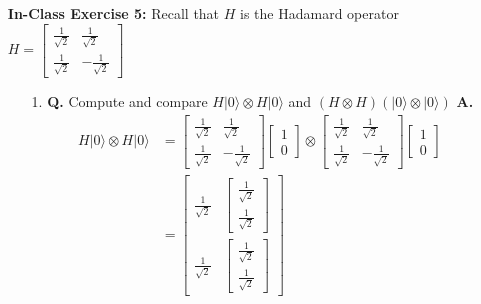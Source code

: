 \documentclass[main.tex]{subfiles}
\begin{document}
\begin{enumerate}
\item[] \textbf{In-Class Exercise 5:} Recall that $H$ is the Hadamard operator $H=\left[\begin{array}{cc}\frac{1}{\sqrt{2}} & \frac{1}{\sqrt{2}} \\ \frac{1}{\sqrt{2}} & -\frac{1}{\sqrt{2}}\end{array}\right]$
\begin{enumerate}
    \item[1.] \textbf{Q.} Compute and compare $H|0\rangle \otimes H|0\rangle$ 
    and $\left(H \otimes H\right)\left(|0\rangle \otimes|0\rangle\right)$ \textbf{A.}
    \begin{align*}
        H|0\rangle \otimes H|0\rangle   & = \left[\begin{array}{cc}\frac{1}{\sqrt{2}} & \frac{1}{\sqrt{2}} \\ 
                                        \frac{1}{\sqrt{2}} & -\frac{1}{\sqrt{2}}\end{array}\right] 
                                        \left[\begin{array}{c} 1 \\ 0 \end{array}\right]
                                        \otimes \left[\begin{array}{cc}\frac{1}{\sqrt{2}} & \frac{1}{\sqrt{2}} \\ 
                                        \frac{1}{\sqrt{2}} & -\frac{1}{\sqrt{2}}\end{array}\right] 
                                        \left[\begin{array}{c} 1 \\ 0 \end{array}\right] \\
                                        & = \left[\begin{array}{ll} \frac{1}{\sqrt{2}} 
                                        & {\left[\begin{array}{l} \frac{1}{\sqrt{2}} \\ \frac{1}{\sqrt{2}} \end{array}\right]} \\
                                        \frac{1}{\sqrt{2}} & {\left[\begin{array}{l} \frac{1}{\sqrt{2}} \\ \frac{1}{\sqrt{2}} \end{array}\right]} \end{array}\right]\\

\end{align*}
\end{enumerate}
\end{enumerate}
\end{document}
